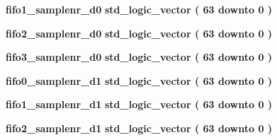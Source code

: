 \begin{DoxyCompactItemize}
\item 
{\bf fifo1\+\_\+samplenr\+\_\+d0} {\bfseries \textcolor{comment}{std\+\_\+logic\+\_\+vector}\textcolor{vhdlchar}{ }\textcolor{vhdlchar}{(}\textcolor{vhdlchar}{ }\textcolor{vhdlchar}{ } \textcolor{vhdldigit}{63} \textcolor{vhdlchar}{ }\textcolor{keywordflow}{downto}\textcolor{vhdlchar}{ }\textcolor{vhdlchar}{ } \textcolor{vhdldigit}{0} \textcolor{vhdlchar}{ }\textcolor{vhdlchar}{)}\textcolor{vhdlchar}{ }} 
\item 
{\bf fifo2\+\_\+samplenr\+\_\+d0} {\bfseries \textcolor{comment}{std\+\_\+logic\+\_\+vector}\textcolor{vhdlchar}{ }\textcolor{vhdlchar}{(}\textcolor{vhdlchar}{ }\textcolor{vhdlchar}{ } \textcolor{vhdldigit}{63} \textcolor{vhdlchar}{ }\textcolor{keywordflow}{downto}\textcolor{vhdlchar}{ }\textcolor{vhdlchar}{ } \textcolor{vhdldigit}{0} \textcolor{vhdlchar}{ }\textcolor{vhdlchar}{)}\textcolor{vhdlchar}{ }} 
\item 
{\bf fifo3\+\_\+samplenr\+\_\+d0} {\bfseries \textcolor{comment}{std\+\_\+logic\+\_\+vector}\textcolor{vhdlchar}{ }\textcolor{vhdlchar}{(}\textcolor{vhdlchar}{ }\textcolor{vhdlchar}{ } \textcolor{vhdldigit}{63} \textcolor{vhdlchar}{ }\textcolor{keywordflow}{downto}\textcolor{vhdlchar}{ }\textcolor{vhdlchar}{ } \textcolor{vhdldigit}{0} \textcolor{vhdlchar}{ }\textcolor{vhdlchar}{)}\textcolor{vhdlchar}{ }} 
\item 
{\bf fifo0\+\_\+samplenr\+\_\+d1} {\bfseries \textcolor{comment}{std\+\_\+logic\+\_\+vector}\textcolor{vhdlchar}{ }\textcolor{vhdlchar}{(}\textcolor{vhdlchar}{ }\textcolor{vhdlchar}{ } \textcolor{vhdldigit}{63} \textcolor{vhdlchar}{ }\textcolor{keywordflow}{downto}\textcolor{vhdlchar}{ }\textcolor{vhdlchar}{ } \textcolor{vhdldigit}{0} \textcolor{vhdlchar}{ }\textcolor{vhdlchar}{)}\textcolor{vhdlchar}{ }} 
\item 
{\bf fifo1\+\_\+samplenr\+\_\+d1} {\bfseries \textcolor{comment}{std\+\_\+logic\+\_\+vector}\textcolor{vhdlchar}{ }\textcolor{vhdlchar}{(}\textcolor{vhdlchar}{ }\textcolor{vhdlchar}{ } \textcolor{vhdldigit}{63} \textcolor{vhdlchar}{ }\textcolor{keywordflow}{downto}\textcolor{vhdlchar}{ }\textcolor{vhdlchar}{ } \textcolor{vhdldigit}{0} \textcolor{vhdlchar}{ }\textcolor{vhdlchar}{)}\textcolor{vhdlchar}{ }} 
\item 
{\bf fifo2\+\_\+samplenr\+\_\+d1} {\bfseries \textcolor{comment}{std\+\_\+logic\+\_\+vector}\textcolor{vhdlchar}{ }\textcolor{vhdlchar}{(}\textcolor{vhdlchar}{ }\textcolor{vhdlchar}{ } \textcolor{vhdldigit}{63} \textcolor{vhdlchar}{ }\textcolor{keywordflow}{downto}\textcolor{vhdlchar}{ }\textcolor{vhdlchar}{ } \textcolor{vhdldigit}{0} \textcolor{vhdlchar}{ }\textcolor{vhdlchar}{)}\textcolor{vhdlchar}{ }} 

\end{DoxyCompactItemize}
